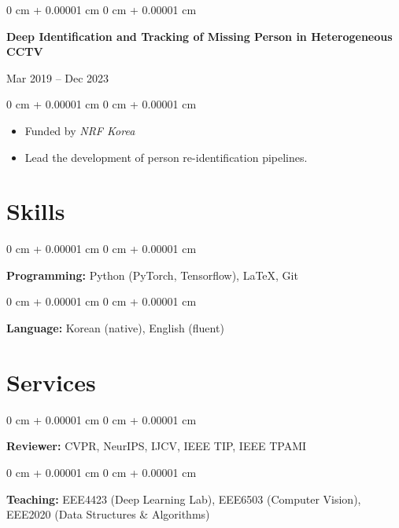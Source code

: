 \documentclass[10pt, letterpaper]{article}
\newenvironment{highlights}{
    \begin{itemize}[
        topsep=0.10 cm,
        parsep=0.10 cm,
        partopsep=0pt,
        itemsep=0pt,
        leftmargin=0 cm + 10pt
    ]
}{
    \end{itemize}
} %
\newenvironment{onecolentry}{
    \begin{adjustwidth}{
        0 cm + 0.00001 cm
    }{
        0 cm + 0.00001 cm
    }
}{
    \end{adjustwidth}
} %
\newenvironment{twocolentry}[2][]{
    \onecolentry
    \def\secondColumn{#2}
    \setcolumnwidth{\fill, 4.5 cm}
    \begin{paracol}{2}
}{
    \switchcolumn \raggedleft \secondColumn
    \end{paracol}
    \endonecolentry
} %
\begin{document}
        \begin{twocolentry}{Mar 2019 – Dec 2023}
        \textbf{Deep Identification and Tracking of Missing Person in Heterogeneous CCTV}
        \end{twocolentry}
        \begin{onecolentry}
        \begin{highlights}\setlength\itemsep{0em}\setlength\parskip{0em}
            \item Funded by \textit{NRF Korea}
            \item Lead the development of person re-identification pipelines.
        \end{highlights}
        \end{onecolentry}
        \vspace{0.2 cm}

    \section{Skills}
        \begin{onecolentry}
            \textbf{Programming:} Python (PyTorch, Tensorflow), LaTeX, Git
        \end{onecolentry}
        \vspace{0.1 cm}
        \begin{onecolentry}
            \textbf{Language:} Korean (native), English (fluent)
        \end{onecolentry}

	\section{Services}
        \begin{onecolentry}
            \textbf{Reviewer:} CVPR, NeurIPS, IJCV, IEEE TIP, IEEE TPAMI
        \end{onecolentry}
        \vspace{0.1 cm}
        \begin{onecolentry}
            \textbf{Teaching:} EEE4423 (Deep Learning Lab), EEE6503 (Computer Vision), EEE2020 (Data Structures \& Algorithms)
     \end{onecolentry}

    
\end{document}

